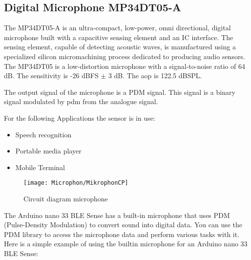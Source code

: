 \subsection{Digital Microphone MP34DT05-A}

The MP34DT05-A is an ultra-compact, low-power, omni directional, digital microphone built with a capacitive sensing element and an IC interface. The sensing element, capable of detecting acoustic waves, is manufactured using a specialized silicon micromachining process dedicated to producing audio sensors.
The MP34DT05 is a low-distortion microphone with a signal-to-noise ratio of 64 dB. The sensitivity is -26 dBFS $\pm$ 3 dB. The \ac{aop} is 122.5 dBSPL.

The output signal of the microphone is a PDM signal. This signal is a binary signal modulated by \ac{pdm}  from the analogue signal. \cite{STMicroelectronics:2021}

For the following Applications the sensor is in use:

\begin{itemize}
    \item Speech recognition 
    \item Portable media player
    \item Mobile Terminal
\end{itemize}

\begin{figure}[h]
  \texttt{[image: Microphon/MikrophonCP]}
  \caption[Circuit diagram microphone]{Circuit diagram microphone \cite{STMicroelectronics:2021}}
\end{figure}

The Arduino nano 33 BLE Sense has a built-in microphone that uses PDM (Pulse-Density Modulation) to convert sound into digital data. You can use the PDM library to access the microphone data and perform various tasks with it. Here is a simple example of using the builtin microphone for an Arduino nano 33 BLE Sense:

